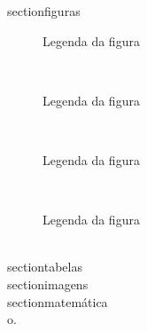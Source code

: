 \documentclass[]{report}
\begin{document}
section{figuras}\\
\begin{figure}[h]
\begin{center}
\end{center}
\caption{Legenda da figura}
\end{figure}\\
\begin{figure}[t]
\begin{center}
\end{center}
\caption{Legenda da figura}
\end{figure}\\
\begin{figure}[b]
\begin{center}
\end{center}
\caption{Legenda da figura}
\end{figure}\\
\begin{figure}[p]
\begin{center}
\end{center}
\caption{Legenda da figura}
\end{figure}\\

section{tabelas}\\
section{imagens}\\
section{matemática}\\




\textbackslashvec o.

\\ 
\text %
\end{document}
